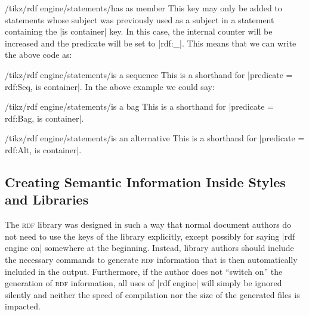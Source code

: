 \begin{key}{/tikz/rdf engine/statements/has as member}
  This key may only be added to statements whose subject was
  previously used as a subject in a statement containing the
  |is container| key. In this case, the internal counter will be
  increased and the predicate will be set to |rdf:_|. This
  means that we can write the above code as:
\begin{codeexample}
\end{codeexample}
\end{key}

\begin{key}{/tikz/rdf engine/statements/is a sequence}
  This is a shorthand for |predicate = rdf:Seq, is container|. In the
  above example we could say:
\begin{codeexample}
\end{codeexample}
\end{key}


\begin{key}{/tikz/rdf engine/statements/is a bag}
  This is a shorthand for |predicate = rdf:Bag, is container|.
\end{key}


\begin{key}{/tikz/rdf engine/statements/is an alternative}
  This is a shorthand for |predicate = rdf:Alt, is container|.
\end{key}


\subsection{Creating Semantic Information Inside Styles and Libraries}

The \textsc{rdf} library was designed in such a way that normal
document authors do not need to use the keys of the library
explicitly, except possibly for saying |rdf engine on| somewhere at
the beginning. Instead, library authors should include the necessary
commands to generate \textsc{rdf} information that is then
automatically included in the output. Furthermore, if the author does
not ``switch on'' the generation of \textsc{rdf} information, all uses
of |rdf engine| will simply be ignored silently and neither the speed
of compilation nor the size of the generated files is impacted.


